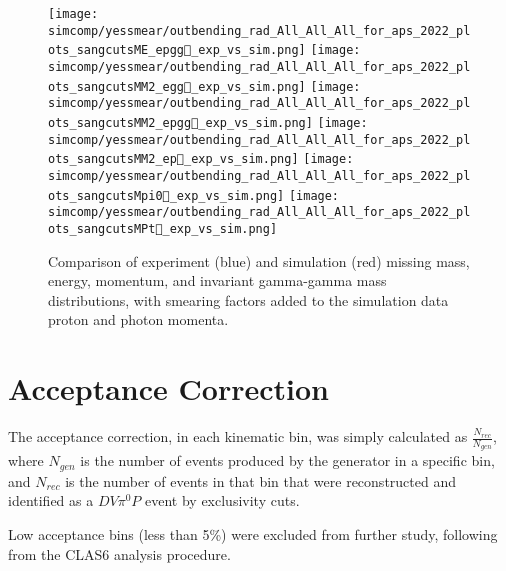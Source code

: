 \begin{figure}[hbt]
	\centering
	\texttt{[image: simcomp/yessmear/outbending\_rad\_All\_All\_All\_for\_aps\_2022\_plots\_sangcutsME\_epgg\_exp\_vs\_sim.png]}
	\texttt{[image: simcomp/yessmear/outbending\_rad\_All\_All\_All\_for\_aps\_2022\_plots\_sangcutsMM2\_egg\_exp\_vs\_sim.png]}
	\texttt{[image: simcomp/yessmear/outbending\_rad\_All\_All\_All\_for\_aps\_2022\_plots\_sangcutsMM2\_epgg\_exp\_vs\_sim.png]}
	\texttt{[image: simcomp/yessmear/outbending\_rad\_All\_All\_All\_for\_aps\_2022\_plots\_sangcutsMM2\_ep\_exp\_vs\_sim.png]}
	\texttt{[image: simcomp/yessmear/outbending\_rad\_All\_All\_All\_for\_aps\_2022\_plots\_sangcutsMpi0\_exp\_vs\_sim.png]}
	\texttt{[image: simcomp/yessmear/outbending\_rad\_All\_All\_All\_for\_aps\_2022\_plots\_sangcutsMPt\_exp\_vs\_sim.png]}
	
	\caption{Comparison of experiment (blue) and simulation (red) missing mass, energy, momentum, and invariant gamma-gamma mass distributions, with smearing factors added to the simulation data proton and photon momenta.}
	\label{fig:good}
\end{figure}


\section{Acceptance Correction}

The acceptance correction, in each kinematic bin, was simply calculated as $\frac{N_{rec}}{N_{gen}}$, where $N_{gen}$ is the number of events produced by the generator in a specific bin, and $N_{rec}$ is the number of events in that bin that were reconstructed and identified as a $DV\pi^0P$ event by exclusivity cuts. 

Low acceptance bins (less than 5\%) were excluded from further study, following from the CLAS6 analysis procedure. 